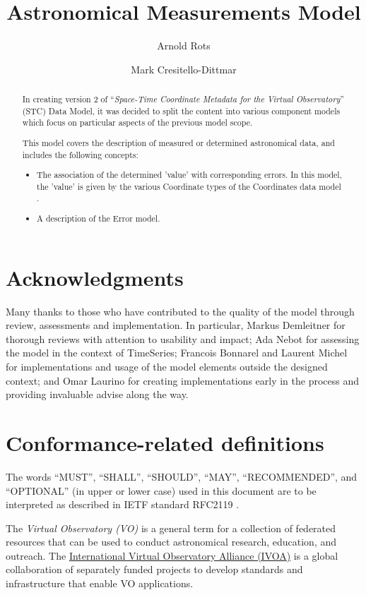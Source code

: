 \documentclass[11pt,a4paper]{ivoa}
\title{Astronomical Measurements Model}
\author{Arnold Rots}
\author{Mark Cresitello-Dittmar}
\begin{document}
\begin{abstract}
  In creating version 2 of ``\emph{Space-Time Coordinate Metadata for the Virtual Observatory}'' (STC) \citep{2007ivoa.spec.1030R} Data Model, it was decided to split the content into various component models which focus on particular aspects of the previous model scope.  
  
  This model covers the description of measured or determined astronomical data, and includes the following concepts:
  \begin{itemize}
  \item The association of the determined 'value' with corresponding errors.  In this model, the 'value' is given by the various Coordinate types of the Coordinates data model \citep{std:Coords}.
  \item A description of the Error model.
  \end{itemize}

\end{abstract}


\section*{Acknowledgments}
Many thanks to those who have contributed to the quality of the model through review, assessments and implementation.
In particular, Markus Demleitner for thorough reviews with attention to usability and impact; Ada Nebot for assessing the
model in the context of TimeSeries; Francois Bonnarel and Laurent Michel for implementations and usage of the model
elements outside the designed context; and Omar Laurino for creating implementations early in the process and providing
invaluable advise along the way.

\section*{Conformance-related definitions}

The words ``MUST'', ``SHALL'', ``SHOULD'', ``MAY'', ``RECOMMENDED'', and
``OPTIONAL'' (in upper or lower case) used in this document are to be
interpreted as described in IETF standard RFC2119 \citep{std:RFC2119}.

The \emph{Virtual Observatory (VO)} is a
general term for a collection of federated resources that can be used
to conduct astronomical research, education, and outreach.
The \href{http://www.ivoa.net}{International
Virtual Observatory Alliance (IVOA)} is a global
collaboration of separately funded projects to develop standards and
infrastructure that enable VO applications.
\end{document}
